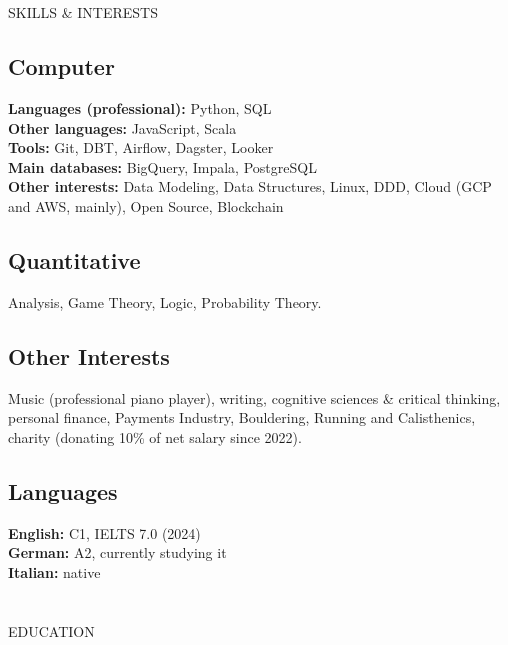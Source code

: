 \documentclass{my_cv}
\begin{document}
\begin{multicols}{2}

\setlength{\columnseprule}{0.2pt}

\section{\faList}{SKILLS \& INTERESTS}

\subsection{Computer}

\textbf{Languages (professional):} Python, SQL \\ %
\textbf{Other languages:} JavaScript, Scala \\ %
\noindent\textbf{Tools:} Git, DBT, Airflow, Dagster, Looker \\ %
\noindent\textbf{Main databases:} BigQuery, Impala, PostgreSQL \\%
\noindent\textbf{Other interests:} Data Modeling, Data Structures, Linux, DDD, Cloud (GCP and AWS, mainly), Open Source, Blockchain  %

\subsection{Quantitative}

Analysis, Game Theory, Logic, Probability Theory.

\subsection{Other Interests}
Music (professional piano player), writing, cognitive sciences \& critical thinking, personal finance, Payments Industry, Bouldering, Running and Calisthenics, charity (donating 10\% of net salary since 2022). 


\subsection{Languages}

\textbf{English:} C1, IELTS 7.0 (2024) \\ %
\noindent\textbf{German:} A2, currently studying it \\ %
\noindent\textbf{Italian:} native \\ %

\noindent
\hrulefill

\section{\faGraduationCap}{EDUCATION}


\end{multicols}
\end{document}
